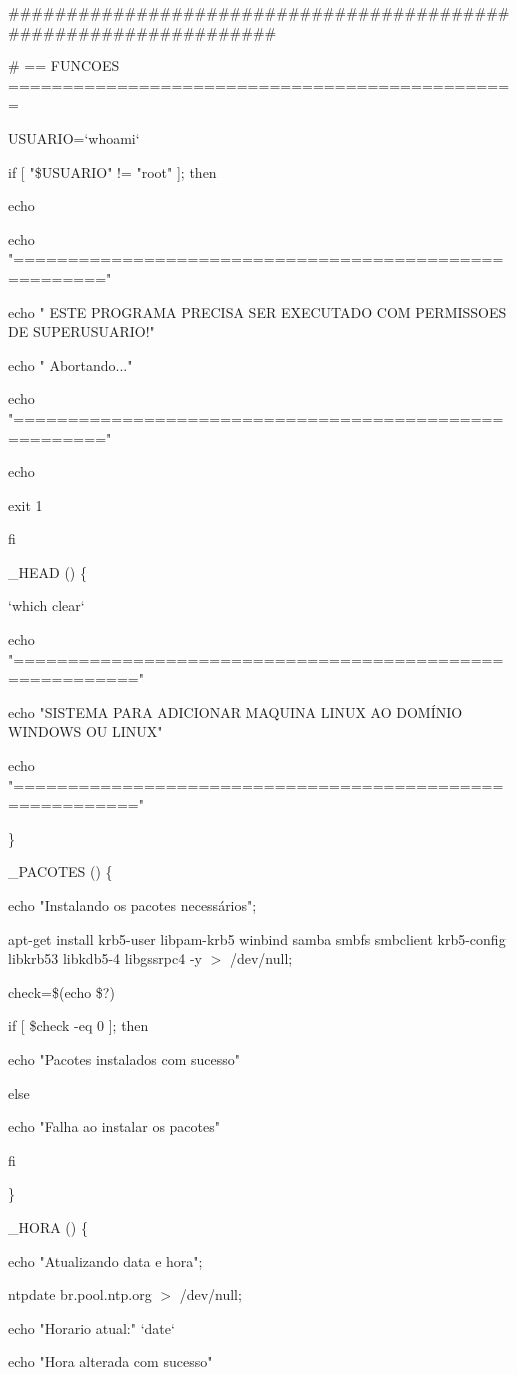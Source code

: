 \#\#\#\#\#\#\#\#\#\#\#\#\#\#\#\#\#\#\#\#\#\#\#\#\#\#\#\#\#\#\#\#\#\#\#\#\#\#\#\#\#\#\#\#\#\#\#\#\#\#\#\#\#\#\#\#\#\#\#\#\#\#\#\#\#\#

\# == FUNCOES ===============================================

USUARIO=`whoami`

if [ "\$USUARIO" != "root" ]; then

 	echo

  echo "======================================================"

  echo " ESTE PROGRAMA PRECISA SER EXECUTADO COM PERMISSOES DE SUPERUSUARIO!"  

  echo " Abortando..."

  echo "======================================================"

  echo

  exit 1

fi

\_HEAD () \{

`which clear`

echo "========================================================="

echo "SISTEMA PARA ADICIONAR MAQUINA LINUX AO DOMÍNIO WINDOWS OU LINUX"

echo "========================================================="

\}

\_PACOTES () \{

        echo "Instalando os pacotes necessários";       


  apt-get install krb5-user libpam-krb5 winbind samba smbfs smbclient krb5-config libkrb53 libkdb5-4 libgssrpc4 -y $>$ /dev/null;
  
      check=\$(echo \$?)

        if [ \$check -eq 0 ]; then

           echo "Pacotes instalados com sucesso"

        else

           echo "Falha ao instalar os pacotes"

        fi

\}

\_HORA () \{

        echo "Atualizando data e hora";

        ntpdate br.pool.ntp.org $>$ /dev/null;

        echo "Horario atual:" `date`

        echo "Hora alterada com sucesso"

